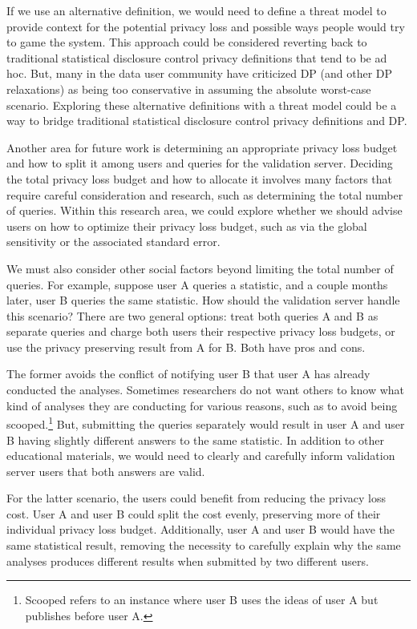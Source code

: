 If we use an alternative definition, we would need to define a threat model to provide context for the potential privacy loss and possible ways people would try to game the system. This approach could be considered reverting back to traditional statistical disclosure control privacy definitions that tend to be ad hoc. But, many in the data user community have criticized DP (and other DP relaxations) as being too conservative in assuming the absolute worst-case scenario. Exploring these alternative definitions with a threat model could be a way to bridge traditional statistical disclosure control privacy definitions and DP.

Another area for future work is determining an appropriate privacy loss budget and how to split it among users and queries for the validation server. Deciding the total privacy loss budget and how to allocate it involves many factors that require careful consideration and research, such as determining the total number of queries. Within this research area, we could explore whether we should advise users on how to optimize their privacy loss budget, such as via the global sensitivity or the associated standard error.

We must also consider other social factors beyond limiting the total number of queries. For example, suppose user A queries a statistic, and a couple months later, user B queries the same statistic. How should the validation server handle this scenario? There are two general options: treat both queries A and B as separate queries and charge both users their respective privacy loss budgets, or use the privacy preserving result from A for B. Both have pros and cons.

The former avoids the conflict of notifying user B that user A has already conducted the analyses. Sometimes researchers do not want others to know what kind of analyses they are conducting for various reasons, such as to avoid being scooped.\footnote{Scooped refers to an instance where user B uses the ideas of user A but publishes before user A.} But, submitting the queries separately would result in user A and user B having slightly different answers to the same statistic. In addition to other educational materials, we would need to clearly and carefully inform validation server users that both answers are valid.

For the latter scenario, the users could benefit from reducing the privacy loss cost. User A and user B could split the cost evenly, preserving more of their individual privacy loss budget. Additionally, user A and user B would have the same statistical result, removing the necessity to carefully explain why the same analyses produces different results when submitted by two different users.

